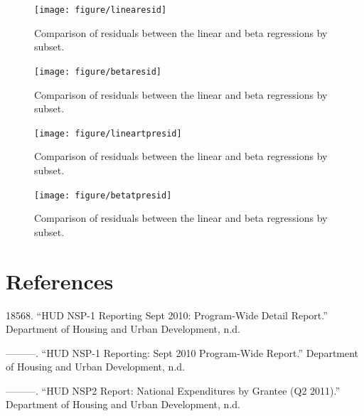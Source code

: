 \documentclass[12pt,oneside]{psthesis}
\begin{document}
\begin{figure}

{\centering \texttt{[image: figure/linearesid]} 

}

\caption{Comparison of residuals between the linear and beta regressions by subset.}\label{fig:resids1}
\end{figure}
\begin{figure}

{\centering \texttt{[image: figure/betaresid]} 

}

\caption{Comparison of residuals between the linear and beta regressions by subset.}\label{fig:resids2}
\end{figure}
\begin{figure}

{\centering \texttt{[image: figure/lineartpresid]} 

}

\caption{Comparison of residuals between the linear and beta regressions by subset.}\label{fig:resids3}
\end{figure}
\begin{figure}

{\centering \texttt{[image: figure/betatpresid]} 

}

\caption{Comparison of residuals between the linear and beta regressions by subset.}\label{fig:resids4}
\end{figure}
\backmatter

\hypertarget{references}{%
\chapter{References}\label{references}}

\setlength{\parindent}{-0.25in}
\setlength{\leftskip}{0.25in}

\noindent

\hypertarget{refs}{}
\leavevmode\hypertarget{ref-185682010huda}{}%
18568. ``HUD NSP-1 Reporting Sept 2010: Program-Wide Detail Report.'' Department of Housing and Urban Development, n.d.

\leavevmode\hypertarget{ref-185682010hud}{}%
---------. ``HUD NSP-1 Reporting: Sept 2010 Program-Wide Report.'' Department of Housing and Urban Development, n.d.

\leavevmode\hypertarget{ref-185682011huda}{}%
---------. ``HUD NSP2 Report: National Expenditures by Grantee (Q2 2011).'' Department of Housing and Urban Development, n.d.
\end{document}
